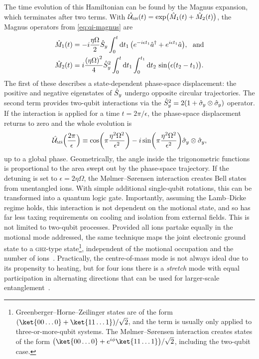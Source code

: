 The time evolution of this Hamiltonian can be found by the Magnus expansion, which terminates after two terms.
With $\hat{\mathcal U}_{\text{{\textsc{ms}}}}(t) = \exp\bigl(\hat{M}_1(t) + \hat{M}_2(t)\bigr)$, the Magnus operators from \cref{eq:qi-magnus} are
\begin{equation}\label{eq:iontrap-ms-magnus}\begin{aligned}
\op M_1(t) &= -i \frac{\eta\Omega}2 \Sy\int_0^t\mathrm dt_1\,\bigl(e^{-i\epsilon t_1}\a^\dagger + e^{i\epsilon t_1}\a\bigr),\ \ \text{and}\\
\op M_2(t) &= i\frac{{(\eta\Omega)}^2}4 \Sy^2\int_0^t\mathrm dt_1\int_0^{t_1}\mathrm dt_2\,\sin\bigl(\epsilon(t_2-t_1)\bigr).
\end{aligned}\end{equation}
The first of these describes a state-dependent phase-space displacement: the positive and negative eigenstates of $\hat{S}_y$ undergo opposite circular trajectories.
The second term provides two-qubit interactions via the $\hat{S}_y^2 = 2(1 + \hat{\sigma}_{\mkern-1mu y}\otimes\hat{\sigma}_{\mkern-1mu y})$ operator.
If the interaction is applied for a time $t = 2\pi/\epsilon$, the phase-space displacement returns to zero and the whole evolution is
\begin{equation}\label{eq:iontrap-ms-u}
\hat{\mathcal U}_{\text{{\textsc{ms}}}}\Bigl(\frac{2\pi}\epsilon\Bigr) \equiv \cos\biggl(\pi\frac{\eta^2\Omega^2}{\epsilon^2}\biggr) - i\sin\biggl(\pi\frac{\eta^2\Omega^2}{\epsilon^2}\biggr)\hat{\sigma}_{\mkern-1mu y}\otimes\hat{\sigma}_{\mkern-1mu y},
\end{equation}
up to a global phase.
Geometrically, the angle inside the trigonometric functions is proportional to the area swept out by the phase-space trajectory.
If the detuning is set to $\epsilon = 2\eta\Omega$, the M\o lmer--S\o rensen interaction creates Bell states from unentangled ions.
With simple additional single-qubit rotations, this can be transformed into a quantum logic gate.
Importantly, assuming the Lamb--Dicke regime holds, this interaction is not dependent on the motional state, and so has far less taxing requirements on cooling and isolation from external fields.
This is not limited to two-qubit processes.
Provided all ions partake equally in the motional mode addressed, the same technique maps the joint electronic ground state to a \textsc{ghz}-type state\footnote{%
    Greenberger--Horne--Zeilinger states are of the form $(\ket{00\dotso0} + \ket{11\dotso1})/\sqrt2$, and the term is usually only applied to three-or-more-qubit systems.
    The M\o lmer--S\o rensen interaction creates states of the form $\bigl(\ket{00\dotso0} + e^{i\phi}\ket{11\dotso1}\bigr)/\sqrt2$, including the two-qubit case.
}, independent of the motional occupation and the number of ions~\cite{Molmer1999,Solano1999}.
Practically, the centre-of-mass mode is not always ideal due to its propensity to heating, but for four ions there is a \emph{stretch} mode with equal participation in alternating directions that can be used for larger-scale entanglement~\cite{Sackett2000}.

